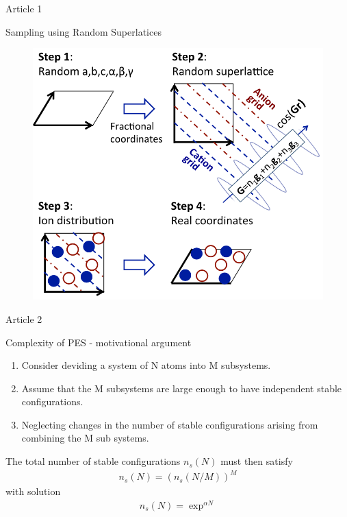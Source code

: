 \documentclass{beamer}
\begin{document}
\begin{frame}{Article 1}
\begin{block}{Sampling using Random Superlatices}
\begin{figure}
	\centering
	\includegraphics[width=0.5\linewidth]{SuperlatticeSampling}
	\label{fig:superlatticesampling}
\end{figure}

\end{block}
\end{frame}

\begin{frame}{Article 2}
\begin{block}{Complexity of PES - motivational argument}
	\begin{enumerate}
		\item Consider deviding a system of N atoms into M subsystems.
		\item Assume that the M subsystems are large enough to have independent stable configurations.
		\item Neglecting changes in the number of stable configurations arising from combining the M sub systems.
	\end{enumerate}
	The total number of stable configurations $n_s(N)$ must then satisfy 
	\begin{align*}
	n_s(N) = \left(n_s(N/M)\right)^M
	\end{align*}
	with solution
	\begin{align*}
	n_s(N) = \exp^{\alpha N}
	\end{align*}
\end{block}
\end{frame}
\end{document}
